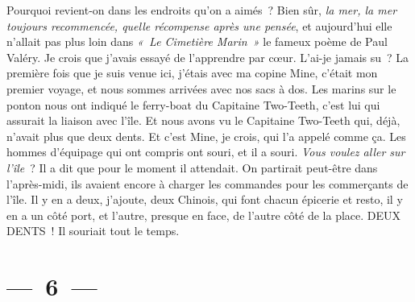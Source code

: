 \documentclass[twoside]{book} %
\begin{document}
\noindent Pourquoi revient-on dans les endroits qu’on a aimés ? Bien sûr, \emph{la mer, la mer toujours recommencée, quelle récompense après une pensée}, et aujourd’hui elle n’allait pas plus loin dans\emph{ « Le Cimetière Marin »} le fameux poème de Paul Valéry. Je crois que j’avais essayé de l’apprendre par cœur. L’ai-je jamais su ? La première fois que je suis venue ici, j’étais avec ma copine Mine, c’était mon premier voyage, et nous sommes arrivées avec nos sacs à dos. Les marins sur le ponton nous ont indiqué le ferry-boat du Capitaine Two-Teeth, c’est lui qui assurait la liaison avec l’île. Et nous avons vu le Capitaine Two-Teeth qui, déjà, n’avait plus que deux dents. Et c’est Mine, je crois, qui l’a appelé comme ça. Les hommes d’équipage qui ont compris ont souri, et il a souri. \emph{Vous voulez aller sur l’île} ? Il a dit que pour le moment il attendait. On partirait peut-être dans l’après-midi, ils avaient encore à charger les commandes pour les commerçants de l’île. Il y en a deux, j’ajoute, deux Chinois, qui font chacun épicerie et resto, il y en a un côté port, et l’autre, presque en face, de l’autre côté de la place. DEUX DENTS ! Il souriait tout le temps.

\section[{— 6 —}]{— 6 —}
\renewcommand{\leftmark}{— 6 —}
\end{document}
